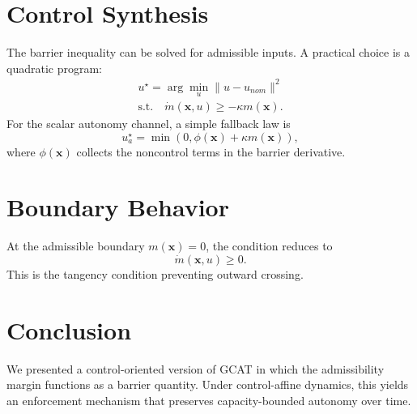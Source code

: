 \documentclass[letterpaper,10pt,conference]{ieeeconf}
\newcommand{\x}{\mathbf{x}}
\begin{document}
\section{Control Synthesis}
The barrier inequality can be solved for admissible inputs. A practical choice is a quadratic program:
\begin{align}
u^\star=\arg\min_u \|u-u_{nom}\|^2\\
\text{s.t.}\quad \dot m(\x,u)\ge -\kappa m(\x).
\end{align}
For the scalar autonomy channel, a simple fallback law is
\[
u_a^\star=\min\left(0,\phi(\x)+\kappa m(\x)\right),
\]
where $\phi(\x)$ collects the noncontrol terms in the barrier derivative.
\section{Boundary Behavior}
At the admissible boundary $m(\x)=0$, the condition reduces to
\[
\dot m(\x,u)\ge 0.
\]
This is the tangency condition preventing outward crossing.
\section{Conclusion}
We presented a control-oriented version of GCAT in which the admissibility margin functions as a barrier quantity. Under control-affine dynamics, this yields an enforcement mechanism that preserves capacity-bounded autonomy over time.
\end{document}
